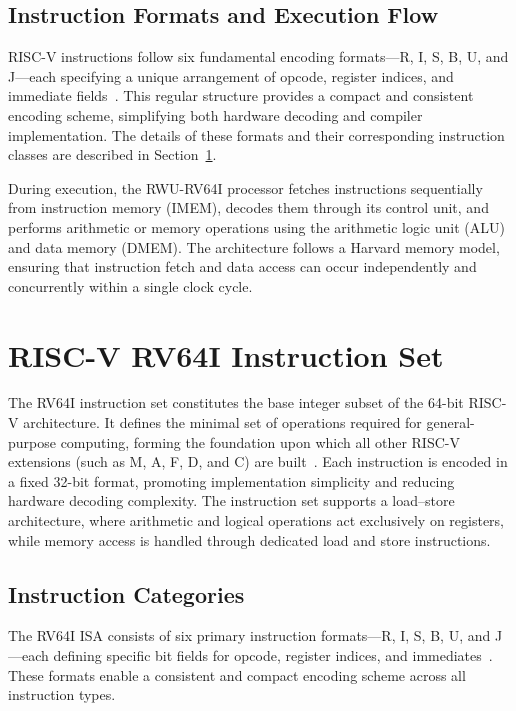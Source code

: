 \subsection{Instruction Formats and Execution Flow}
RISC-V instructions follow six fundamental encoding formats—R, I, S, B, U, and J—each specifying a unique arrangement of opcode, register indices, and immediate fields~\cite{riscv-spec}.  
This regular structure provides a compact and consistent encoding scheme, simplifying both hardware decoding and compiler implementation.  
The details of these formats and their corresponding instruction classes are described in Section~\ref{sec:rv64i_instructions}.

During execution, the RWU-RV64I processor fetches instructions sequentially from instruction memory (IMEM), decodes them through its control unit, and performs arithmetic or memory operations using the arithmetic logic unit (ALU) and data memory (DMEM).  
The architecture follows a Harvard memory model, ensuring that instruction fetch and data access can occur independently and concurrently within a single clock cycle.

\section{RISC-V RV64I Instruction Set}
\label{sec:rv64i_instructions}

The RV64I instruction set constitutes the base integer subset of the 64-bit RISC-V architecture.  
It defines the minimal set of operations required for general-purpose computing, forming the foundation upon which all other RISC-V extensions (such as M, A, F, D, and C) are built~\cite{riscv-spec,patterson2017riscv}.  
Each instruction is encoded in a fixed 32-bit format, promoting implementation simplicity and reducing hardware decoding complexity.  
The instruction set supports a load–store architecture, where arithmetic and logical operations act exclusively on registers, while memory access is handled through dedicated load and store instructions.

\subsection{Instruction Categories}
The RV64I ISA consists of six primary instruction formats—R, I, S, B, U, and J—each defining specific bit fields for opcode, register indices, and immediates~\cite{riscv-spec}.  
These formats enable a consistent and compact encoding scheme across all instruction types.

